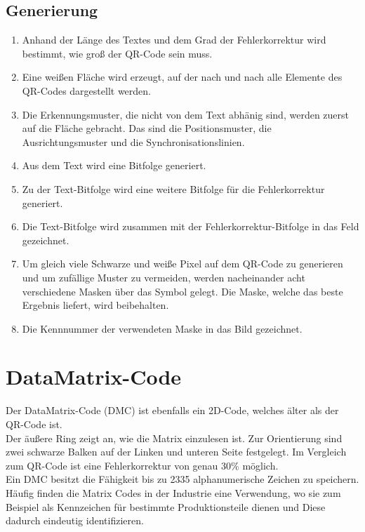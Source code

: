 \documentclass[12pt,					%
							 oneside,			%
							 a4paper,			%
							 halfparskip,		%
							 liststotoc,			%
							 bibtotoc,			%
							 fleqn,				%
							 pointlessnumbers]	%
							 {scrreprt}
\begin{document}
\subsection{Generierung}
\begin{enumerate}
\item Anhand der Länge des Textes und dem Grad der Fehlerkorrektur wird bestimmt, wie groß der QR-Code sein muss. 
\item Eine weißen Fläche wird erzeugt, auf der nach und nach alle Elemente des QR-Codes dargestellt werden. 
\item Die Erkennungsmuster, die nicht von dem Text abhänig sind, werden zuerst auf die Fläche gebracht. Das sind die Positionsmuster, die  Ausrichtungsmuster und die Synchronisationslinien.
\item Aus dem Text wird eine Bitfolge generiert.
\item Zu der Text-Bitfolge wird eine weitere Bitfolge für die Fehlerkorrektur generiert.
\item Die Text-Bitfolge wird zusammen mit der Fehlerkorrektur-Bitfolge in das Feld gezeichnet.
\item Um gleich viele Schwarze und weiße Pixel auf dem QR-Code zu generieren und um zufällige Muster zu vermeiden, werden nacheinander acht verschiedene Masken über das Symbol gelegt. Die Maske, welche das beste Ergebnis liefert, wird beibehalten.
\item Die Kennnummer der verwendeten Maske in das Bild gezeichnet.
\end{enumerate}

\section{DataMatrix-Code}
Der DataMatrix-Code (DMC) ist ebenfalls ein 2D-Code, welches älter als der QR-Code ist. \\
Der äußere Ring zeigt an, wie die Matrix einzulesen ist. Zur Orientierung sind zwei schwarze Balken auf der Linken und unteren Seite festgelegt\cite{matrix}.
Im Vergleich zum QR-Code ist eine Fehlerkorrektur von genau 30\% möglich.\\
Ein DMC besitzt die Fähigkeit bis zu 2335 alphanumerische Zeichen zu speichern. Häufig finden die Matrix Codes in der Industrie eine Verwendung, wo sie zum Beispiel als Kennzeichen für bestimmte Produktionsteile dienen und Diese dadurch eindeutig identifizieren.
\end{document}
